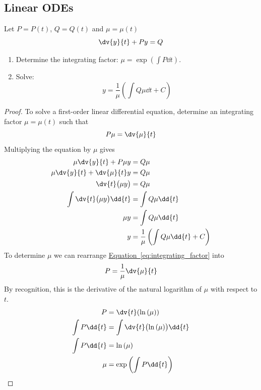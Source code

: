 \documentclass{article}
\begin{document}
\subsection{Linear ODEs}
Let \(P=P(t)\), \(Q=Q(t)\) and \(\mu = \mu(t)\)
\begin{equation*}
    \dv{y}{t} + Py = Q
\end{equation*}
\begin{enumerate}
    \item Determine the integrating factor: \(\displaystyle \mu=\exp{\left( \int P \dd{t} \right)}\).
    \item Solve:
          \begin{equation*}
              y=\frac{1}{\mu}\left(\int Q \mu \dd{t} + C\right)
          \end{equation*}
\end{enumerate}
\begin{proof}
    To solve a first-order linear differential equation, determine an integrating factor \(\mu = \mu(t)\) such that
    \begin{equation}
        P \mu = \dv{\mu}{t} \label{eq:integrating_factor}
    \end{equation}
    Multiplying the equation by \(\mu \) gives
    \begin{align*}
        \mu \dv{y}{t} + P \mu y             & = Q \mu                                           \\
        \mu \dv{y}{t} + \dv{\mu}{t} y       & = Q \mu                                           \\
        \dv{t}\bigl(\mu y\bigr)             & = Q \mu                                           \\
        \int \dv{t}\bigl(\mu y\bigr) \dd{t} & = \int Q \mu \dd{t}                               \\
        \mu y                               & = \int Q \mu \dd{t}                               \\
        y                                   & = \frac{1}{\mu}\left(\int Q \mu \dd{t} + C\right)
    \end{align*}
    To determine \(\mu \) we can rearrange \hyperref[eq:integrating_factor]{Equation~\ref{eq:integrating_factor}} into
    \begin{align*}
        P = \frac{1}{\mu}\dv{\mu}{t}
    \end{align*}
    By recognition, this is the derivative of the natural logarithm of \(\mu \) with respect to \(t\).
    \begin{align*}
        P             & = \dv{t}(\ln{\left( \mu \right)})                       \\
        \int P \dd{t} & = \int \dv{t}\bigl(\ln{\left( \mu \right)}\bigr) \dd{t} \\
        \int P \dd{t} & = \ln{\left( \mu \right)}                               \\
        \mu           & = \exp{\left( \int P \dd{t} \right)}
    \end{align*}
\end{proof}
\end{document}

